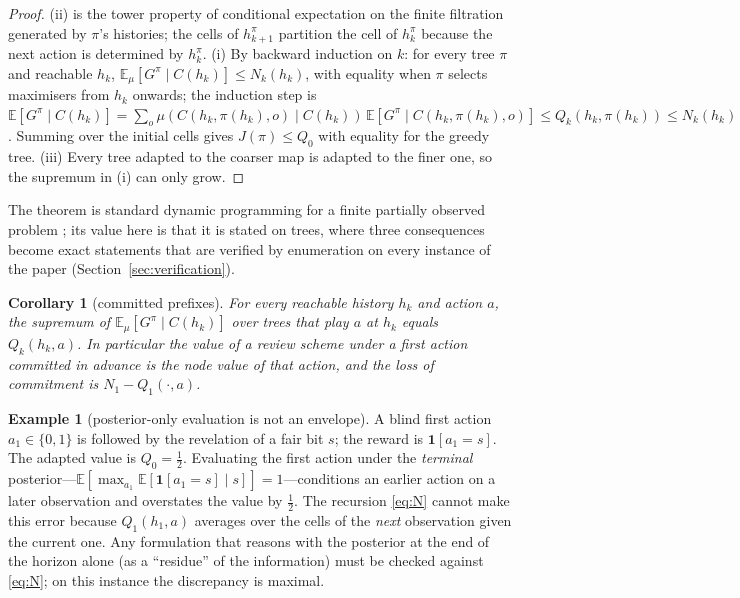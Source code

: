 \documentclass[11pt,a4paper]{article}
\theoremstyle{plain}
\newtheorem{corollary}[theorem]{Corollary}
\theoremstyle{definition}
\newtheorem{example}[theorem]{Example}
\theoremstyle{remark}
\newcommand{\E}{\mathbb{E}}
\newcommand{\ind}[1]{\mathbf{1}[#1]}
\newcommand{\tfr}[2]{\tfrac{#1}{#2}}
\begin{document}
\begin{proof}
(ii) is the tower property of conditional expectation on the finite filtration generated by $\pi$'s histories; the cells of $h^\pi_{k+1}$ partition the cell of $h^\pi_k$ because the next action is determined by $h_k^\pi$. (i) By backward induction on $k$: for every tree $\pi$ and reachable $h_k$, $\E_\mu[G^\pi\mid C(h_k)]\le N_k(h_k)$, with equality when $\pi$ selects maximisers from $h_k$ onwards; the induction step is $\E[G^\pi\mid C(h_k)]=\sum_o\mu(C(h_k,\pi(h_k),o)\mid C(h_k))\,\E[G^\pi\mid C(h_k,\pi(h_k),o)]\le Q_k(h_k,\pi(h_k))\le N_k(h_k)$. Summing over the initial cells gives $J(\pi)\le Q_0$ with equality for the greedy tree. (iii) Every tree adapted to the coarser map is adapted to the finer one, so the supremum in (i) can only grow.
\end{proof}

The theorem is standard dynamic programming for a finite partially observed problem \cite{Astrom1965,BertsekasShreve1978}; its value here is that it is stated on trees, where three consequences become exact statements that are verified by enumeration on every instance of the paper (Section~\ref{sec:verification}).

\begin{corollary}[committed prefixes]\label{cor:prefix}
For every reachable history $h_k$ and action $a$, the supremum of $\E_\mu[G^\pi\mid C(h_k)]$ over trees that play $a$ at $h_k$ equals $Q_k(h_k,a)$. In particular the value of a review scheme under a first action committed in advance is the node value of that action, and the loss of commitment is $N_1-Q_1(\cdot,a)$.
\end{corollary}

\begin{example}[posterior-only evaluation is not an envelope]\label{ex:posterior}
A blind first action $a_1\in\{0,1\}$ is followed by the revelation of a fair bit $s$; the reward is $\ind{a_1=s}$. The adapted value is $Q_0=\tfr12$. Evaluating the first action under the \emph{terminal} posterior---$\E[\max_{a_1}\E[\ind{a_1=s}\mid s]]=1$---conditions an earlier action on a later observation and overstates the value by $\tfr12$. The recursion \eqref{eq:N} cannot make this error because $Q_1(h_1,a)$ averages over the cells of the \emph{next} observation given the current one. Any formulation that reasons with the posterior at the end of the horizon alone (as a ``residue'' of the information) must be checked against \eqref{eq:N}; on this instance the discrepancy is maximal.
\end{example}
\end{document}
